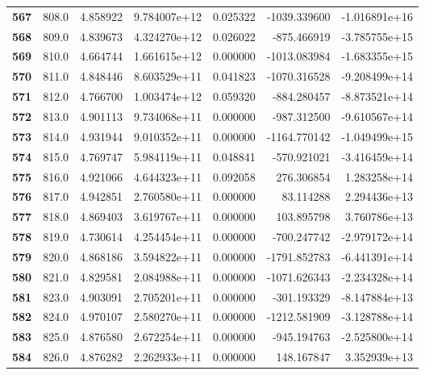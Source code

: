 \documentclass{report}[12pt]
\begin{document}
\begin{center}
\begin{tabular}{lrrrrrr}
\textbf{567 } &          808.0 &   4.858922 &  9.784007e+12 &    0.025322 & -1039.339600 & -1.016891e+16 \\
\textbf{568 } &          809.0 &   4.839673 &  4.324270e+12 &    0.026022 &  -875.466919 & -3.785755e+15 \\
\textbf{569 } &          810.0 &   4.664744 &  1.661615e+12 &    0.000000 & -1013.083984 & -1.683355e+15 \\
\textbf{570 } &          811.0 &   4.848446 &  8.603529e+11 &    0.041823 & -1070.316528 & -9.208499e+14 \\
\textbf{571 } &          812.0 &   4.766700 &  1.003474e+12 &    0.059320 &  -884.280457 & -8.873521e+14 \\
\textbf{572 } &          813.0 &   4.901113 &  9.734068e+11 &    0.000000 &  -987.312500 & -9.610567e+14 \\
\textbf{573 } &          814.0 &   4.931944 &  9.010352e+11 &    0.000000 & -1164.770142 & -1.049499e+15 \\
\textbf{574 } &          815.0 &   4.769747 &  5.984119e+11 &    0.048841 &  -570.921021 & -3.416459e+14 \\
\textbf{575 } &          816.0 &   4.921066 &  4.644323e+11 &    0.092058 &   276.306854 &  1.283258e+14 \\
\textbf{576 } &          817.0 &   4.942851 &  2.760580e+11 &    0.000000 &    83.114288 &  2.294436e+13 \\
\textbf{577 } &          818.0 &   4.869403 &  3.619767e+11 &    0.000000 &   103.895798 &  3.760786e+13 \\
\textbf{578 } &          819.0 &   4.730614 &  4.254454e+11 &    0.000000 &  -700.247742 & -2.979172e+14 \\
\textbf{579 } &          820.0 &   4.868186 &  3.594822e+11 &    0.000000 & -1791.852783 & -6.441391e+14 \\
\textbf{580 } &          821.0 &   4.829581 &  2.084988e+11 &    0.000000 & -1071.626343 & -2.234328e+14 \\
\textbf{581 } &          823.0 &   4.903091 &  2.705201e+11 &    0.000000 &  -301.193329 & -8.147884e+13 \\
\textbf{582 } &          824.0 &   4.970107 &  2.580270e+11 &    0.000000 & -1212.581909 & -3.128788e+14 \\
\textbf{583 } &          825.0 &   4.876580 &  2.672254e+11 &    0.000000 &  -945.194763 & -2.525800e+14 \\
\textbf{584 } &          826.0 &   4.876282 &  2.262933e+11 &    0.000000 &   148.167847 &  3.352939e+13 \\

\end{tabular}
\end{center}
\end{document}
